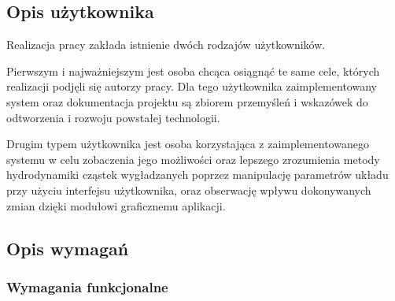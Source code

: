 \documentclass[polish, 12pt]{aghthesis}
\begin{document}
	
	\subsection{Opis użytkownika}
	
	Realizacja pracy zakłada istnienie dwóch rodzajów użytkowników.
	
	Pierwszym i najważniejszym jest osoba chcąca osiągnąć te same cele, których realizacji podjęli się autorzy pracy. Dla tego użytkownika zaimplementowany system oraz dokumentacja projektu są zbiorem przemyśleń i wskazówek do odtworzenia i rozwoju powstałej technologii.
	
	Drugim typem użytkownika jest osoba korzystająca z zaimplementowanego systemu w celu zobaczenia jego możliwości oraz lepszego zrozumienia metody hydrodynamiki cząstek wygładzanych poprzez manipulację parametrów układu przy użyciu interfejsu użytkownika, oraz obserwację wpływu dokonywanych zmian dzięki modułowi graficznemu aplikacji.
	
	\subsection{Opis wymagań}
	
		\subsubsection{Wymagania funkcjonalne}
		
\end{document}
